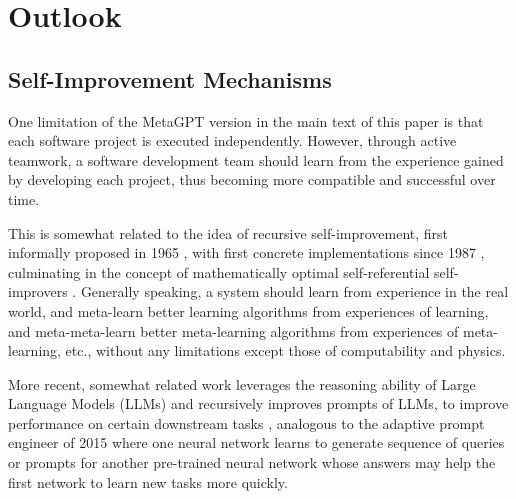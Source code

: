 \newpage
\newpage
  
\appendix

\section{Outlook}\label{appendix: outlook}

\subsection{Self-Improvement Mechanisms}

One limitation of the MetaGPT version in the main text of this paper is that each software project is executed independently. However, through active teamwork, a software development team should learn from the experience gained by developing each project, thus becoming more compatible and successful over time.  

This is somewhat related to the idea of recursive self-improvement, first informally proposed in 1965 \citep{DBLP:journals/ac/Good65}, with first concrete implementations since 1987 \citep{schmidhuber1987evolutionary, schmidhuber1993self, schmidhuber1998reinforcement}, culminating in the concept of mathematically optimal self-referential self-improvers  \citep{Schmidhuber:03gm3,Schmidhuber:09gm}. Generally speaking, a system should learn from experience in the real world, and meta-learn better learning algorithms from experiences of learning, and meta-meta-learn better meta-learning algorithms from experiences of meta-learning, etc., without any limitations except those of computability and physics. 


More recent, somewhat related work leverages the reasoning ability of Large Language Models (LLMs) and recursively improves prompts of LLMs, to improve performance on certain downstream tasks \citep{fernando2023promptbreeder, zelikman2023self}, analogous to the adaptive prompt engineer of 2015 \citep{schmidhuber2015learning} where one neural network learns to generate sequence of queries or prompts for another pre-trained neural network whose answers may help the first network to learn new tasks more quickly.

